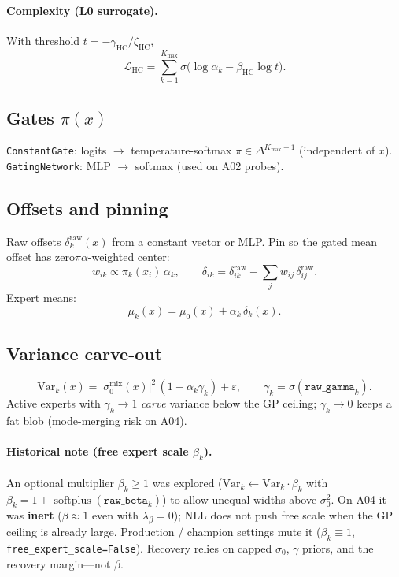 \documentclass[11pt,a4paper]{article}
\newcommand{\softplus}{\operatorname{softplus}}
\newcommand{\sigmoid}{\sigma}
\newcommand{\Kmax}{K_{\max}}
\begin{document}
\paragraph{Complexity (L0 surrogate).}
With threshold \(t=-\gamma_{\mathrm{HC}}/\zeta_{\mathrm{HC}}\),
\begin{equation}
  \mathcal{L}_{\mathrm{HC}}
  =
  \sum_{k=1}^{\Kmax}
  \sigmoid\!\bigl(
    \log\alpha_k
    -
    \beta_{\mathrm{HC}}\log t
  \bigr).
\end{equation}

\subsection{Gates \(\pi(x)\)}
\texttt{ConstantGate}: logits \(\to\) temperature-softmax \(\pi\in\Delta^{\Kmax-1}\)
(independent of \(x\)).
\texttt{GatingNetwork}: MLP \(\to\) softmax (used on A02 probes).

\subsection{Offsets and pinning}
Raw offsets \(\delta_k^{\mathrm{raw}}(x)\) from a constant vector or MLP.
Pin so the gated mean offset has zero\(\pi\alpha\)-weighted center:
\begin{equation}
  w_{ik}
  \propto
  \pi_k(x_i)\,\alpha_k,
  \qquad
  \delta_{ik}
  =
  \delta_{ik}^{\mathrm{raw}}
  -
  \sum_{j} w_{ij}\,\delta_{ij}^{\mathrm{raw}}.
\end{equation}
Expert means:
\begin{equation}
  \boxed{
  \mu_k(x)
  =
  \mu_0(x)
  +
  \alpha_k\,\delta_k(x).
  }
\end{equation}

\subsection{Variance carve-out}
\begin{equation}
  \boxed{
  \mathrm{Var}_k(x)
  =
  \bigl[\sigma_0^{\mathrm{mix}}(x)\bigr]^2
  \,(1-\alpha_k\gamma_k)
  +
  \varepsilon,
  }
  \qquad
  \gamma_k=\sigmoid(\texttt{raw\_gamma}_k).
\end{equation}
Active experts with \(\gamma_k\to 1\) \emph{carve} variance below the GP ceiling;
\(\gamma_k\to 0\) keeps a fat blob (mode-merging risk on A04).

\paragraph{Historical note (free expert scale \(\beta_k\)).}
An optional multiplier \(\beta_k\ge 1\) was explored
(\(\mathrm{Var}_k\leftarrow\mathrm{Var}_k\cdot\beta_k\) with
\(\beta_k=1+\softplus(\texttt{raw\_beta}_k)\)) to allow unequal widths above
\(\sigma_0^2\). On A04 it was \textbf{inert} (\(\beta\approx 1\) even with
\(\lambda_\beta=0\)); NLL does not push free scale when the GP ceiling is already
large. Production / champion settings mute it (\(\beta_k\equiv 1\),
\texttt{free\_expert\_scale=False}). Recovery relies on capped \(\sigma_0\),
\(\gamma\) priors, and the recovery margin---not \(\beta\).
\end{document}
